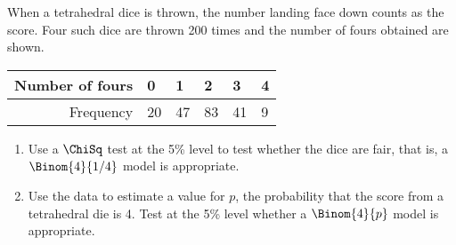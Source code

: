 \begin{problem}
    When a tetrahedral dice is thrown, the number landing face down counts as the score. Four such dice are thrown 200 times and the number of fours obtained are shown.

    \begin{table}[H]
        \centering
        \begin{tabular}{|r|l|l|l|l|l|}
        \hline
        Number of fours & 0 & 1 & 2 & 3 & 4 \\ \hline
        Frequency & 20 & 47 & 83 & 41 & 9 \\ \hline
        \end{tabular}
    \end{table}

    \begin{enumerate}
        \item Use a $\ChiSq$ test at the 5\% level to test whether the dice are fair, that is, a $\Binom{4}{1/4}$ model is appropriate.
        \item Use the data to estimate a value for $p$, the probability that the score from a tetrahedral die is 4. Test at the 5\% level whether a $\Binom{4}{p}$ model is appropriate.
    \end{enumerate}
\end{problem}
